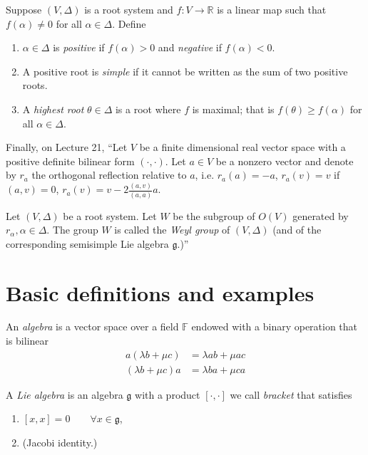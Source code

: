 Suppose $(V,\Delta)$ is a root system and $f:V \to \mathbb{R}$ is
a linear map such that $f(\alpha)\neq 0$ for all $\alpha \in \Delta$.
Define \cite[Definition 17.1]{KLAL}
\begin{enumerate}
\item $\alpha \in \Delta$ is {\it positive} if $f(\alpha)>0$ 
and  {\it negative} if $f(\alpha)<0$.
\item A positive root is {\it simple} if it cannot be written
as the sum of two positive roots.
\item A {\it highest root} $\theta \in \Delta$ is
a root where $f$ is maximal;
that is $f(\theta)\geq f(\alpha)$ for all $\alpha \in \Delta$.
\end{enumerate}

Finally, on Lecture 21,
``Let $V$ be a finite dimensional real vector space
with a positive definite bilinear form $(\cdot,\cdot)$.
Let $a \in V$ be a nonzero vector and denote
by $r_a$ the orthogonal reflection relative to $a$,
i.e. $r_a(a)=-a$, $r_a(v)=v$ if $(a,v)=0$,
$r_a(v)=v-2\frac{(a,v)}{(a,a)}a$.

Let $(V,\Delta)$ be a root system.
Let $W$ be the subgroup of $O(V)$ generated by $r_\alpha, \alpha \in \Delta$.
The group $W$ is called the {\it Weyl group} of $(V,\Delta)$
(and of the corresponding semisimple Lie algebra $\mathfrak{g}$.)''

\section{Basic definitions and examples}
\label{section-basic-definitions-and-examples}

\begin{definition}
\label{definition-algebra}
An {\it algebra} is a vector space over a field $\mathbb{F}$ endowed with a
binary operation that is bilinear
\begin{align*}
a(\lambda b+\mu c)&=\lambda ab+\mu ac\\
(\lambda b + \mu c) a &= \lambda b a + \mu c a
\end{align*}
\end{definition}

\begin{definition}
\label{definition-Lie-algebra}
A {\it Lie algebra} is an algebra $\mathfrak{g}$ 
with a product $[\cdot,\cdot]$ we call 
{\it bracket} that satisfies
\begin{enumerate}
\item $[x,x]=0\qquad \forall x\in \mathfrak{g}$,
\item (Jacobi identity.)
\end{enumerate}
\end{definition}

